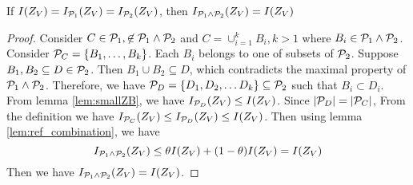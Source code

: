 \documentclass{article}
\begin{document}
\begin{lemma}\label{lemma:lattice}
If $I(Z_V) = I_{\P_1}(Z_V) = I_{\P_2}(Z_V)$, then $I_{\P_1 \wedge \P_2}(Z_V)=I(Z_V) $
\end{lemma}
\begin{proof}
Consider $C\in \P_1, \not\in \P_1\wedge\P_2$ and $C = \cup_{i=1}^k B_i, k>1$ where $B_i \in \P_1 \wedge \P_2$.
Consider $\P_C = \{B_1, \dots, B_k\}$. Each $B_i$ belongs to one of subsets of $\P_2$. Suppose $B_1, B_2 \subseteq D \in \P_2$. Then $B_1\cup B_2 \subseteq D$,
which contradicts the maximal property of $\P_1\wedge \P_2$. Therefore, we have $\P_D = \{D_1, D_2, \dots D_k\}\subseteq \P_2$ such that $B_i \subset D_i$.
From lemma \ref{lem:smallZB}, we have $I_{\P_D}(Z_V) \leq I(Z_V)$. Since $\abs{\P_D} = \abs{\P_C}$, From the definition we have $I_{\P_C}(Z_V) \leq I_{\P_D}(Z_V) \leq I(Z_V)$.
Then using lemma \ref{lem:ref_combination}, we have
\begin{equation*}
I_{\P_1 \wedge \P_2}(Z_V) \leq \theta I(Z_V) + (1- \theta)I(Z_V) = I(Z_V)
\end{equation*} 
Then we have $I_{\P_1 \wedge \P_2}(Z_V)=I(Z_V)$.
\end{proof}
\end{document}
